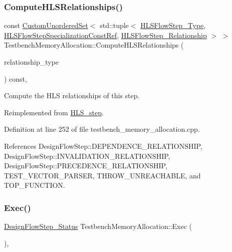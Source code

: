 \subsubsection{\texorpdfstring{Compute\+H\+L\+S\+Relationships()}{ComputeHLSRelationships()}}
{\footnotesize\ttfamily const \hyperlink{classCustomUnorderedSet}{Custom\+Unordered\+Set}$<$ std\+::tuple$<$ \hyperlink{hls__step_8hpp_ada16bc22905016180e26fc7e39537f8d}{H\+L\+S\+Flow\+Step\+\_\+\+Type}, \hyperlink{hls__step_8hpp_a5fdd2edf290c196531d21d68e13f0e74}{H\+L\+S\+Flow\+Step\+Specialization\+Const\+Ref}, \hyperlink{hls__step_8hpp_a3ad360b9b11e6bf0683d5562a0ceb169}{H\+L\+S\+Flow\+Step\+\_\+\+Relationship} $>$ $>$ Testbench\+Memory\+Allocation\+::\+Compute\+H\+L\+S\+Relationships (\begin{DoxyParamCaption}\item[{const \hyperlink{classDesignFlowStep_a723a3baf19ff2ceb77bc13e099d0b1b7}{Design\+Flow\+Step\+::\+Relationship\+Type}}]{relationship\+\_\+type }\end{DoxyParamCaption}) const\hspace{0.3cm}{\ttfamily [override]}, {\ttfamily [virtual]}}



Compute the H\+LS relationships of this step. 



Reimplemented from \hyperlink{classHLS__step_aed0ce8cca9a1ef18e705fc1032ad4de5}{H\+L\+S\+\_\+step}.



Definition at line 252 of file testbench\+\_\+memory\+\_\+allocation.\+cpp.



References Design\+Flow\+Step\+::\+D\+E\+P\+E\+N\+D\+E\+N\+C\+E\+\_\+\+R\+E\+L\+A\+T\+I\+O\+N\+S\+H\+IP, Design\+Flow\+Step\+::\+I\+N\+V\+A\+L\+I\+D\+A\+T\+I\+O\+N\+\_\+\+R\+E\+L\+A\+T\+I\+O\+N\+S\+H\+IP, Design\+Flow\+Step\+::\+P\+R\+E\+C\+E\+D\+E\+N\+C\+E\+\_\+\+R\+E\+L\+A\+T\+I\+O\+N\+S\+H\+IP, T\+E\+S\+T\+\_\+\+V\+E\+C\+T\+O\+R\+\_\+\+P\+A\+R\+S\+ER, T\+H\+R\+O\+W\+\_\+\+U\+N\+R\+E\+A\+C\+H\+A\+B\+LE, and T\+O\+P\+\_\+\+F\+U\+N\+C\+T\+I\+ON.

\mbox{\label{classTestbenchMemoryAllocation_a043da976f1d68793e6c264fb105eb7e9}} 
\subsubsection{\texorpdfstring{Exec()}{Exec()}}
{\footnotesize\ttfamily \hyperlink{design__flow__step_8hpp_afb1f0d73069c26076b8d31dbc8ebecdf}{Design\+Flow\+Step\+\_\+\+Status} Testbench\+Memory\+Allocation\+::\+Exec (\begin{DoxyParamCaption}{ }\end{DoxyParamCaption})\hspace{0.3cm}{\ttfamily [override]}, {\ttfamily [virtual]}}




